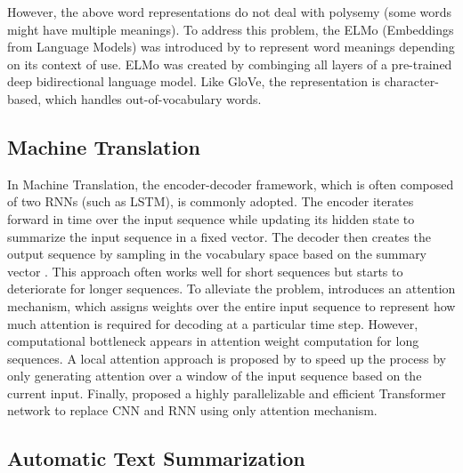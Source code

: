 However, the above word representations do not deal with polysemy (some words might have multiple meanings). To address this problem, the ELMo (Embeddings from Language Models) was introduced by \cite{peters2018deep} to represent word meanings depending on its context of use. ELMo was created by combinging all layers of a pre-trained deep bidirectional language model. Like GloVe, the representation is character-based, which handles out-of-vocabulary words. 

\subsection{Machine Translation}
In Machine Translation, the encoder-decoder framework, which is often composed of two RNNs (such as LSTM), is commonly adopted. The encoder iterates forward in time over the input sequence while updating its hidden state to summarize the input sequence in a fixed vector. The decoder then creates the output sequence by sampling in the vocabulary space based on the summary vector \cite{sutskever2014sequence,cho2014learning}. This approach often works well for short sequences but starts to deteriorate for longer sequences. To alleviate the problem, \cite{bahdanau2014neural} introduces an attention mechanism, which assigns weights over the entire input sequence to represent how much attention is required for decoding at a particular time step. However, computational bottleneck appears in attention weight computation for long sequences. A local attention approach is proposed by \cite{luong2015effective} to speed up the process by only generating attention over a window of the input sequence based on the current input. Finally, \cite{vaswani2017attention} proposed a highly parallelizable and efficient Transformer network to replace CNN and RNN using only attention mechanism.

\subsection{Automatic Text Summarization}

